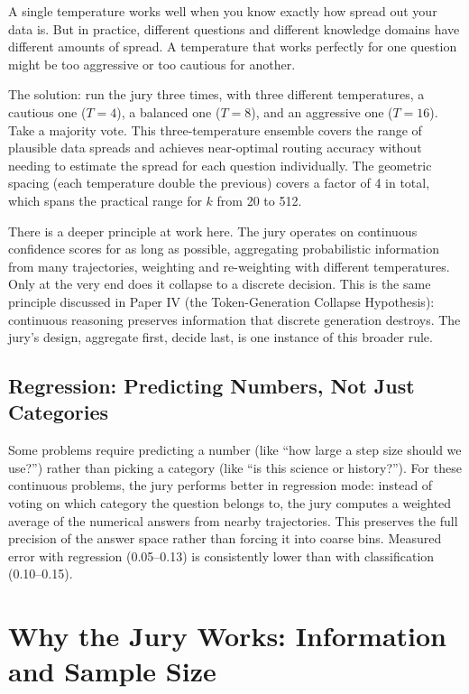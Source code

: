 \documentclass[11pt]{article}
\begin{document}
A single temperature works well when you know exactly how spread out your
data is. But in practice, different questions and different knowledge domains
have different amounts of spread. A temperature that works perfectly for one
question might be too aggressive or too cautious for another.

The solution: run the jury three times, with three different temperatures, a
cautious one ($T=4$), a balanced one ($T=8$), and an aggressive one ($T=16$).
Take a majority vote. This three-temperature ensemble covers the range of
plausible data spreads and achieves near-optimal routing accuracy without
needing to estimate the spread for each question individually. The geometric
spacing (each temperature double the previous) covers a factor of 4 in total,
which spans the practical range for $k$ from 20 to 512.

There is a deeper principle at work here. The jury operates on continuous
confidence scores for as long as possible, aggregating probabilistic
information from many trajectories, weighting and re-weighting with different
temperatures. Only at the very end does it collapse to a discrete decision.
This is the same principle discussed in Paper IV (the Token-Generation
Collapse Hypothesis): continuous reasoning preserves information that
discrete generation destroys. The jury's design, aggregate first, decide
last, is one instance of this broader rule.

\subsection{Regression: Predicting Numbers, Not Just Categories}

Some problems require predicting a number (like ``how large a step size should
we use?'') rather than picking a category (like ``is this science or
history?''). For these continuous problems, the jury performs better in
regression mode: instead of voting on which category the question
belongs to, the jury computes a weighted average of the numerical answers from
nearby trajectories. This preserves the full precision of the answer space
rather than forcing it into coarse bins. Measured error with regression
(0.05--0.13) is consistently lower than with classification (0.10--0.15).

\newpage
\section{Why the Jury Works: Information and Sample Size}
\end{document}
